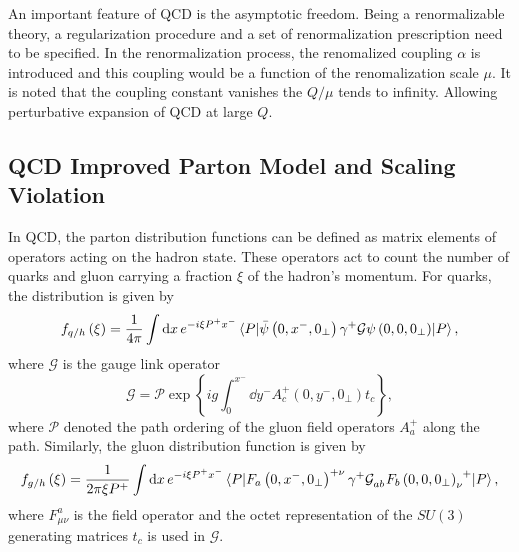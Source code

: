An important feature of QCD is the asymptotic freedom. Being a renormalizable 
theory, a regularization procedure and a set of renormalization prescription 
need to be specified. In the renormalization process, the renomalized coupling $\alpha$
is introduced and this coupling would be a function of the renomalization scale $\mu$.
It is noted that the coupling constant vanishes the $Q/\mu$ tends to infinity. 
Allowing perturbative expansion of QCD at large $Q$. 


\subsection{QCD Improved Parton Model and Scaling Violation}
\label{subsec:scaling_violation}
In QCD, the parton distribution functions can be defined as matrix elements of 
operators acting on the hadron state. These operators act to count the number of
quarks and gluon carrying a fraction $\xi$ of the hadron's momentum. For quarks,
the distribution is given by\cite{collins1989} 
\begin{equation}
	f_{q/h}\left(\xi\right) = \frac{1}{4\pi}\int \dd{x} e^{-i\xi P^{+} x^{-}} \mel{P}{\bar{\psi}\left(0,x^-,0_\perp\right)\gamma^+ \mathcal{G} \psi\left(0,0,0_\perp\right)}{P},
\end{equation}
where $\mathcal{G}$ is the gauge link operator
\begin{equation}
	\mathcal{G}=\mathcal{P} \exp \left\{ ig\int_0^{x^-}\dd{y^-} A_c^+ \left(0,y^-,0_\perp\right)t_c\right\},
\end{equation}
where $\mathcal{P}$ denoted the path ordering of the gluon field operators $A_a^+$
along the path. Similarly, the gluon distribution function is given by
\begin{equation}
	f_{g/h}\left(\xi\right) = \frac{1}{2\pi\xi P^+}\int \dd{x} e^{-i\xi P^{+} x^{-}} \mel{P}{\tensor{F_a\left(0,x^-,0_\perp\right)}{^+^\nu}\gamma^{+} \tensor{\mathcal{G}}{_a_b} \tensor{F_b\left(0,0,0_\perp\right)}{_\nu^+}}{P},
\end{equation}
where $F^a_{\mu\nu}$ is the field operator and the octet representation of the $SU(3)$
generating matrices $t_c$ is used in $\mathcal{G}$.








